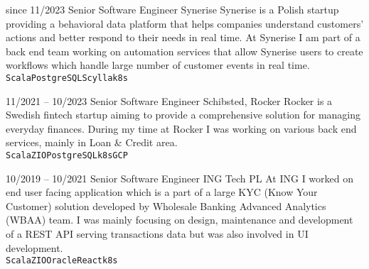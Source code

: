 \documentclass[9pt]{developercv}
\begin{document}
\begin{entrylist}
	\entry
		{since 11/2023}
		{Senior Software Engineer}
		{Synerise}
    {Synerise is a Polish startup providing a behavioral data platform that helps companies understand customers' actions and better respond to their needs in real time. At Synerise I am part of a back end team working on automation services that allow Synerise users to create workflows which handle large number of customer events in real time.\\
		\texttt{Scala}\slashsep\texttt{PostgreSQL}\slashsep\texttt{Scylla}\slashsep\texttt{k8s}}

	\entry
		{11/2021 -- 10/2023}
		{Senior Software Engineer}
		{Schibsted, Rocker}
    {Rocker is a Swedish fintech startup aiming to provide a comprehensive solution for managing everyday finances. During my time at Rocker I was working on various back end services, mainly in Loan \& Credit area.\\
		\texttt{Scala}\slashsep\texttt{ZIO}\slashsep\texttt{PostgreSQL}\slashsep\texttt{k8s}\slashsep\texttt{GCP}}

	\entry
		{10/2019 -- 10/2021}
		{Senior Software Engineer}
		{ING Tech PL}
		{At ING I worked on end user facing application which is a part of a large KYC (Know Your Customer) solution developed by Wholesale Banking Advanced Analytics (WBAA) team. I was mainly focusing on design, maintenance and development of a REST API serving transactions data but was also involved in UI development.\\
		\texttt{Scala}\slashsep\texttt{ZIO}\slashsep\texttt{Oracle}\slashsep\texttt{React}\slashsep\texttt{k8s}}


\end{entrylist}
\end{document}
